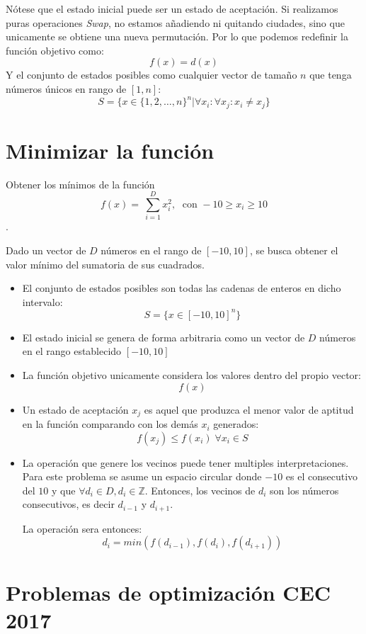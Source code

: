 Nótese que el estado inicial puede ser un estado de aceptación. Si realizamos puras operaciones \textit{Swap}, no estamos añadiendo ni quitando ciudades, sino que unicamente se obtiene una nueva permutación. Por lo que podemos redefinir la función objetivo como: \[ f(x) = d(x) \] Y el conjunto de estados posibles como cualquier vector de tamaño $n$ que tenga números únicos en rango de $[1,n]$: \[ S = \{ x \in \{1, 2, \dots, n  \}^n | \forall x_i \colon \forall x_j \colon x_i \neq x_j \}\]

\section{Minimizar la función}

Obtener los mínimos de la función \[ f(x) = \ \sum_{i = 1}^{D} x_i^2, \; \text{ con } -10 \geq x_i \geq 10 \].

Dado un vector de $D$ números en el rango de $[-10, 10]$, se busca obtener el valor mínimo del sumatoria  de sus cuadrados.

\begin{itemize}
	\item El conjunto de estados posibles son todas las cadenas de enteros en dicho intervalo: \[ S = \{ x \in [-10, 10]^n \} \]
	
	\item El estado inicial se genera de forma arbitraria como un vector de $D$ números en el rango establecido $[-10, 10]$
	
	\item La función objetivo unicamente considera los valores dentro del propio vector: \[f(x) \]
	
	\item Un estado de aceptación $x_j$ es aquel que produzca el menor valor de aptitud en la función comparando con los demás $x_i$ generados: \[ f(x_j) \leq f(x_i) \; \forall x_i \in S\] 
	
	\item La operación que genere los vecinos puede tener multiples interpretaciones. Para este problema se asume un espacio circular donde $-10$ es el consecutivo del $10$ y que $\forall d_i \in D, d_i \in \mathbb{Z}$.  Entonces, los vecinos de $d_i$ son los números consecutivos, es decir $d_{i-1}$ y $d_{i+1}$.
	
	La operación sera entonces:
	\[ d_i = min(f(d_{i-1}), f(d_i), f(d_{i+1})) \]	
\end{itemize}

\clearpage
\section{Problemas de optimización CEC 2017}

